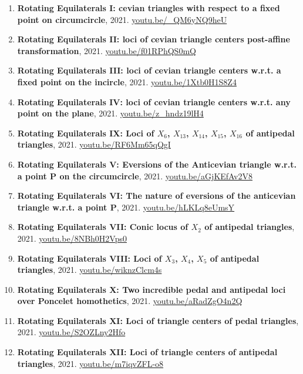 \documentclass[12pt]{article}
\begin{document}
\begin{enumerate}[resume]
\item \textbf{Rotating Equilaterals I: cevian triangles with respect to a fixed point on circumcircle}, 2021. \href{https://youtu.be/_QM6yNQ9heU}{\url{youtu.be/\_QM6yNQ9heU}}
\item \textbf{Rotating Equilaterals II: loci of cevian triangle centers post-affine transformation}, 2021. \href{https://youtu.be/f01RPhQS0mQ}{\url{youtu.be/f01RPhQS0mQ}}
\item \textbf{Rotating Equilaterals III: loci of cevian triangle centers w.r.t. a fixed point on the incircle}, 2021. \href{https://youtu.be/1Xtb0H1S8Z4}{\url{youtu.be/1Xtb0H1S8Z4}}
\item \textbf{Rotating Equilaterals IV: loci of cevian triangle centers w.r.t. any point on the plane}, 2021. \href{https://youtu.be/z_hndz19lH4}{\url{youtu.be/z\_hndz19lH4}}
\item \textbf{Rotating Equilaterals IX: Loci of $X_{6}$, $X_{13}$, $X_{14}$, $X_{15}$, $X_{16}$ of antipedal triangles}, 2021. \href{https://youtu.be/RF6Mm65qQgI}{\url{youtu.be/RF6Mm65qQgI}}
\item \textbf{Rotating Equilaterals V: Eversions of the Anticevian triangle w.r.t. a point P on the circumcircle}, 2021. \href{https://youtu.be/aGjKEfAv2V8}{\url{youtu.be/aGjKEfAv2V8}}
\item \textbf{Rotating Equilaterals VI: The nature of eversions of the anticevian triangle w.r.t. a point P}, 2021. \href{https://youtu.be/hLKLq8eUmsY}{\url{youtu.be/hLKLq8eUmsY}}
\item \textbf{Rotating Equilaterals VII: Conic locus of $X_{2}$ of antipedal triangles}, 2021. \href{https://youtu.be/8NBh0H2Vps0}{\url{youtu.be/8NBh0H2Vps0}}
\item \textbf{Rotating Equilaterals VIII: Loci of $X_{3}$, $X_{4}$, $X_{5}$ of antipedal triangles}, 2021. \href{https://youtu.be/wiknzClcm4s}{\url{youtu.be/wiknzClcm4s}}
\item \textbf{Rotating Equilaterals X: Two incredible pedal and antipedal loci over Poncelet homothetics}, 2021. \href{https://youtu.be/aRadZgO4n2Q}{\url{youtu.be/aRadZgO4n2Q}}
\item \textbf{Rotating Equilaterals XI: Loci of triangle centers of pedal triangles}, 2021. \href{https://youtu.be/S2OZLny2Hfo}{\url{youtu.be/S2OZLny2Hfo}}
\item \textbf{Rotating Equilaterals XII: Loci of triangle centers of antipedal triangles}, 2021. \href{https://youtu.be/m7iqvZFL-o8}{\url{youtu.be/m7iqvZFL-o8}}
\end{enumerate}
\end{document}
